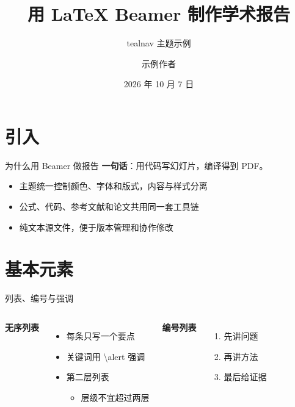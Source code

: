 \documentclass[aspectratio=169,11pt,fontset=fandol]{ctexbeamer}
\title{用 \LaTeX{} Beamer 制作学术报告}
\subtitle{tealnav 主题示例}
\author{示例作者}
\institute{示例单位}
\date{2026 年 10 月 7 日}
\begin{document}
\begin{frame}[plain]
  \titlepage
\end{frame}

\begin{frame}[plain]
  \tableofcontents
\end{frame}

\section{引入}

\begin{frame}{为什么用 Beamer 做报告}
  \textbf{一句话}：用\alert{代码}写幻灯片，编译得到 PDF。

  \medskip
  \begin{itemize}
    \item 主题统一控制颜色、字体和版式，内容与样式分离
    \item 公式、代码、参考文献和论文共用同一套工具链
    \item 纯文本源文件，便于版本管理和协作修改
  \end{itemize}
\end{frame}

\section[基本元素]{基本元素}

\begin{frame}{列表、编号与强调}
  \begin{columns}[T]
    \textbf{无序列表}
    \begin{itemize}
      \item 每条只写一个要点
      \item 关键词用 \alert{\textbackslash alert} 强调
      \item 第二层列表
      \begin{itemize}
        \item 层级不宜超过两层
      \end{itemize}
    \end{itemize}
    \textbf{编号列表}
    \begin{enumerate}
      \item 先讲问题
      \item 再讲方法
      \item 最后给证据
    \end{enumerate}
  \end{columns}
\end{frame}
\end{document}
